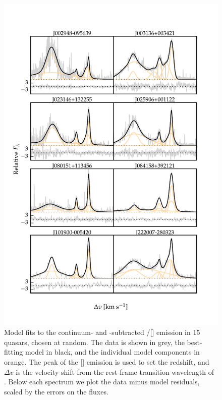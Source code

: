 \begin{figure}
    \centering
    \includegraphics[width=\textwidth]{figures/chapter04/example_spectrum_grid.pdf} 
    \caption[{Model fits to the continuum- and -subtracted \hbns/[] emission in 15 quasars, chosen at random.}]{Model fits to the continuum- and -subtracted \hbns/[] emission in 15 quasars, chosen at random. The data is shown in grey, the best-fitting model in black, and the individual model components in orange. The peak of the [] emission is used to set the redshift, and $\Delta{v}$ is the velocity shift from the rest-frame transition wavelength of \hb. Below each spectrum we plot the data minus model residuals, scaled by the errors on the fluxes.}     
    \label{fig:example_spectrum_grid}
\end{figure}

